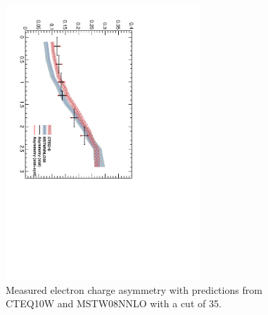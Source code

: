 \begin{figure}[htbp]
  \begin{center}
\includegraphics*[width=0.65\textwidth,angle=90]{Asym_35}
  \caption[Measured electron charge asymmetry with a \pT cut of
\unit{35}{\GeV}.] {\label{fig:asym35} Measured electron charge asymmetry with
predictions from CTEQ10W and MSTW08NNLO with a \pT cut of
\unit{35}{\GeV}\cite{baisini2010electron}.}
  \end{center}
\end{figure}

